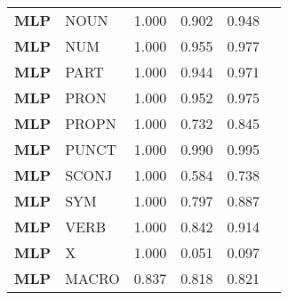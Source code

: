 \begin{table}
\begin{tabular}{|l|l|l|l|l|l|}
\textbf{MLP} & NOUN & 1.000 & 0.902 & 0.948 \\
\textbf{MLP} & NUM & 1.000 & 0.955 & 0.977 \\
\textbf{MLP} & PART & 1.000 & 0.944 & 0.971 \\
\textbf{MLP} & PRON & 1.000 & 0.952 & 0.975 \\
\textbf{MLP} & PROPN & 1.000 & 0.732 & 0.845 \\
\textbf{MLP} & PUNCT & 1.000 & 0.990 & 0.995 \\
\textbf{MLP} & SCONJ & 1.000 & 0.584 & 0.738 \\
\textbf{MLP} & SYM & 1.000 & 0.797 & 0.887 \\
\textbf{MLP} & VERB & 1.000 & 0.842 & 0.914 \\
\textbf{MLP} & X & 1.000 & 0.051 & 0.097 \\
\textbf{MLP} & MACRO & 0.837 & 0.818 & 0.821 \\
\bottomrule
\end{tabular}
\end{table}
